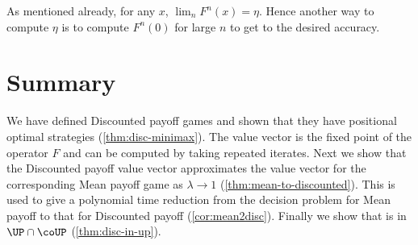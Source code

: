 As mentioned already, for any $x$, $\lim_n F^n(x)=\eta$. Hence another way to compute $\eta$ is to compute $F^n(0)$ for large $n$ to get to the desired accuracy.

\section{Summary}
We have defined Discounted payoff games and shown that they have positional optimal strategies (\autoref{thm:disc-minimax}). The value vector is the fixed point of the operator $F$ and can be computed by taking repeated iterates. Next we show that the Discounted payoff value vector approximates the value vector for the corresponding Mean payoff game as $\lambda \to 1$ (\autoref{thm:mean-to-discounted}). This is used to give a polynomial time reduction from the decision problem for Mean payoff  to that for Discounted payoff  (\autoref{cor:mean2disc}). Finally we show that  is in $\UP \cap \coUP$ (\autoref{thm:disc-in-up}).
